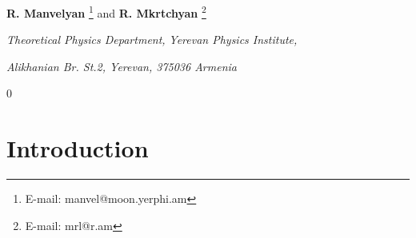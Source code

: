 \documentclass[a4paper,12pt]{article}
\begin{document}
\begin{center}

\vspace{1cm} {\bf R. Manvelyan} \footnote{ E-mail:
manvel@moon.yerphi.am}  and {\bf R. Mkrtchyan} \footnote{ E-mail:
mrl@r.am} \vspace{1cm}

\vspace{1cm}

{\it Theoretical Physics Department,} {\it Yerevan Physics
Institute,}

{\it Alikhanian Br. St.2, Yerevan, 375036 Armenia }
\end{center}

\vspace{1cm}
\begin{abstract}
Free field equations, with various spins, for space-time algebras
with second-rank tensor (instead of usual vector) momentum are
constructed. Similar algebras are appearing in superstring/M
theories. The most attention is payed to the gauge invariance
properties, particularly the spin two equations with gauge
invariance are constructed for dimensions 2+2 and 2+4 and
connection to Einstein equation and diffeomorphism invariance is
established.
\end{abstract}

\renewcommand{\thefootnote}{\arabic{footnote}} \setcounter{footnote}0
{\smallskip \pagebreak }





\section{Introduction\newline}
\end{document}
